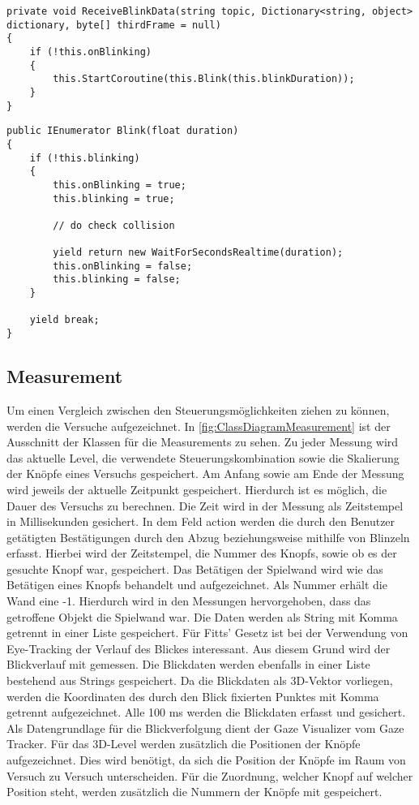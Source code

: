 \begin{lstlisting}[caption=Methode ReceiveBlinkData,label=lstlisting:ReceiveBlinkData]
private void ReceiveBlinkData(string topic, Dictionary<string, object> dictionary, byte[] thirdFrame = null)
{
	if (!this.onBlinking)
	{
		this.StartCoroutine(this.Blink(this.blinkDuration));
	}
}
\end{lstlisting}

\begin{lstlisting}[caption=Ausschnitt aus Methode Blink,label=lstlisting:Blink]
public IEnumerator Blink(float duration)
{
	if (!this.blinking)
	{
		this.onBlinking = true;
		this.blinking = true;
		
		// do check collision
		
		yield return new WaitForSecondsRealtime(duration);
		this.onBlinking = false;
		this.blinking = false;
	}
	
	yield break;
}
\end{lstlisting}

\subsection{Measurement}
\label{section:measurement}
Um einen Vergleich zwischen den Steuerungsmöglichkeiten ziehen zu können, werden die Versuche aufgezeichnet. In \autoref{fig:ClassDiagramMeasurement} ist der Ausschnitt der Klassen für die Measurements zu sehen. Zu jeder Messung wird das aktuelle Level, die verwendete Steuerungskombination sowie die Skalierung der Knöpfe eines Versuchs gespeichert. Am Anfang sowie am Ende der Messung wird jeweils der aktuelle Zeitpunkt gespeichert. Hierdurch ist es möglich, die Dauer des Versuchs zu berechnen. Die Zeit wird in der Messung als Zeitstempel in Millisekunden gesichert. In dem Feld {\ttfamily action} werden die durch den Benutzer getätigten Bestätigungen durch den Abzug beziehungsweise mithilfe von Blinzeln erfasst. Hierbei wird der Zeitstempel, die Nummer des Knopfs, sowie ob es der gesuchte Knopf war, gespeichert. Das Betätigen der Spielwand wird wie das Betätigen eines Knopfs behandelt und aufgezeichnet. Als Nummer erhält die Wand eine -1. Hierdurch wird in den Messungen hervorgehoben, dass das getroffene Objekt die Spielwand war. Die Daten werden als String mit Komma getrennt in einer Liste gespeichert. Für Fitts' Gesetz ist bei der Verwendung von Eye-Tracking der Verlauf des Blickes interessant. Aus diesem Grund wird der Blickverlauf mit gemessen. Die Blickdaten werden ebenfalls in einer Liste bestehend aus Strings gespeichert. Da die Blickdaten als 3D-Vektor vorliegen, werden die Koordinaten des durch den Blick fixierten Punktes mit Komma getrennt aufgezeichnet. Alle 100 ms werden die Blickdaten erfasst und gesichert. Als Datengrundlage für die Blickverfolgung dient der Gaze Visualizer vom Gaze Tracker. Für das 3D-Level werden zusätzlich die Positionen der Knöpfe aufgezeichnet. Dies wird benötigt, da sich die Position der Knöpfe im Raum von Versuch zu Versuch unterscheiden. Für die Zuordnung, welcher Knopf auf welcher Position steht, werden zusätzlich die Nummern der Knöpfe mit gespeichert.

